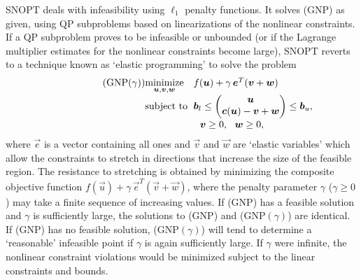 \documentclass[twocolumn,numbook]{svjour3}          %
\makeatletter
\def\u{{\vec u}}
\def\c{{\vec c}}
\def\w{{\vec w}}
\def\v{{\vec v}}
\def\e{{\vec e}}
\def\b{{\vec b}}
\def\A{{\vec A}}
\def\minim{\mathop{\hbox{\rm minimize}}}
\def\minimize#1{{\displaystyle\minim_{#1}}}
\def\subject{\mbox{\rm subject to}}
\def\strutl{\rule[-1.25ex]{0pt}{3ex}}%
\def\NP#1{NP$(#1)$}
\def\GNP#1{GNP$(#1)$}
\def\SNOPT {{\small SNOPT}}
\def\problem#1#2#3#4{%
   {\begin{tabular*}{0.47\textwidth}
    {@{}l@{\extracolsep{\fill}}l@{\extracolsep{6pt}}l@{\extracolsep{\fill}}c@{}}
      #1 & $\minimize{#2}$ & $#3$ & $ $ \\[5pt]
         & $\subject$      & $#4$ & $ $
    \end{tabular*}}}
\def\newproblem#1#2#3#4#5{%
   {\begin{tabular*}{0.47\textwidth}
    {@{}l@{\extracolsep{\fill}}l@{\extracolsep{6pt}}l@{\extracolsep{\fill}}c@{}}
      #1 & $\minimize{#2}$ & $#3$ & $ $ \\[5pt]
         & $\subject$      & $#4$ & $ $ \\[5pt]
         & & $#5$ & $ $
    \end{tabular*}}}
\newcommand{\pmat}[1]{\begin{pmatrix}#1\end{pmatrix}}
\makeatother
\begin{document}
\SNOPT{} deals with infeasibility using $\ell_1$ penalty functions.
%
%
It solves (GNP) as given, using QP subproblems
based on linearizations of the nonlinear constraints.
If a QP subproblem proves to be infeasible or unbounded (or if the
Lagrange multiplier estimates for the nonlinear constraints become
large), \SNOPT{} reverts to a technique known as `elastic programming' to solve the problem
\[
   \newproblem{(\GNP{\gamma})}{\u,\v,\w}{f(\u) + \gamma \, \e^T(\v + \w)}
                 { \b_l \le \pmat{\u\\ \c(\u) - \v + \w \strutl} \le \b_u,}
                 { \ \ \v \ge 0, \ \ \w \ge 0,}
\]
where $\e$ is a vector containing all ones and $\v$ and $\w$ are `elastic variables' which allow the constraints to stretch in directions that increase the size of the feasible region. The resistance to stretching is obtained by minimizing the composite objective function $f(\u) + \gamma \, \e^T(\v + \w)$, where the penalty parameter $\gamma$ ($\gamma \ge 0$) may take a
finite sequence of increasing values.  
If (GNP) has a feasible solution and $\gamma$ is sufficiently large,
the solutions to (GNP) and (\GNP{\gamma}) are identical.
If (GNP) has no feasible solution, (\GNP{\gamma}) will tend to
determine a `reasonable' infeasible point if $\gamma$ is again sufficiently
large.  If $\gamma$ were infinite, the nonlinear constraint violations would
be minimized subject to the linear constraints and bounds.
\end{document}
